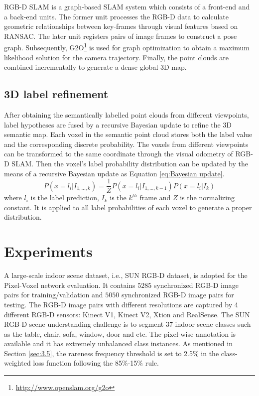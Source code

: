 \documentclass[letterpaper, 10 pt, conference]{ieeeconf}
\begin{document}
RGB-D SLAM is a graph-based SLAM system which consists of a front-end and a back-end units. The former unit processes the RGB-D data to calculate geometric relationships between key-frames through visual features based on RANSAC. The later unit registers pairs of image frames to construct a pose graph. Subsequently, G2O\footnote{\url{http://www.openslam.org/g2o}} is used for graph optimization to obtain a maximum likelihood solution for the camera trajectory. Finally, the point clouds are combined incrementally to generate a dense global 3D map.

\subsection{3D label refinement}\label{sec:3.7}
After obtaining the semantically labelled point clouds from different viewpoints, label hypotheses are fused by a recursive Bayesian update to refine the 3D semantic map. Each voxel in the semantic point cloud stores both the label value and the corresponding discrete probability. The voxels from different viewpoints can be transformed to the same coordinate through the visual odometry of RGB-D SLAM. Then the voxel's label probability distribution can be updated by the means of a recursive Bayesian update as Equation \ref{eq:Bayesian update}.
\begin{equation}
P(x = l_{i}|I_{1,...,k}) = \dfrac{1}{Z} P(x = l_{i}|I_{1,...,k-1})P(x = l_{i}|I_{k})
\label{eq:Bayesian update}
\end{equation}     
where $l_{i}$ is the label prediction, $I_{k}$ is the $k^{th}$ frame and $Z$ is the normalizing constant. It is applied to all label probabilities of each voxel to generate a proper distribution. 
\section{Experiments}\label{sec:4}
A large-scale indoor scene dataset, i.e., SUN RGB-D dataset, is adopted for the Pixel-Voxel network evaluation. It contains $5285$ synchronized RGB-D image pairs for training/validation and $5050$ synchronized RGB-D image pairs for testing. The RGB-D image pairs with different resolutions are captured by 4 different RGB-D sensors: Kinect V1, Kinect V2, Xtion and RealSense. The SUN RGB-D scene understanding challenge is to segment $37$ indoor scene classes such as the table, chair, sofa, window, door and etc. The pixel-wise annotation is available and it has extremely unbalanced class instances. As mentioned in Section \ref{sec:3.5}, the rareness frequency threshold is set to 2.5\% in the class-weighted loss function following the 85\%-15\% rule.  
\end{document}

